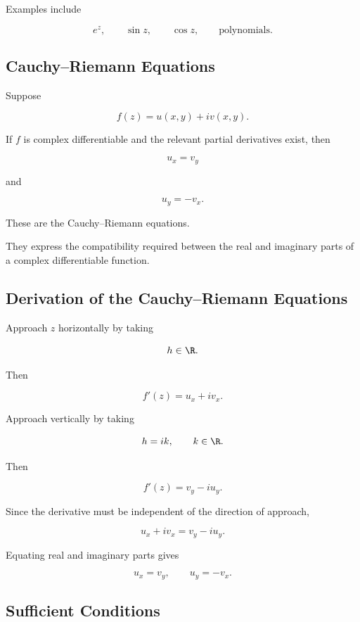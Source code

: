 Examples include

\[
\boxed{
e^z,
\qquad
\sin z,
\qquad
\cos z,
\qquad
\text{polynomials}.
}
\]

\subsection{Cauchy--Riemann Equations}
\label{subsec:cauchy-riemann}

Suppose

\[
f(z)=u(x,y)+iv(x,y).
\]

If \(f\) is complex differentiable and the relevant partial derivatives
exist, then

\[
\boxed{
u_x=v_y
}
\]

and

\[
\boxed{
u_y=-v_x.
}
\]

These are the Cauchy--Riemann equations.

They express the compatibility required between the real and imaginary
parts of a complex differentiable function.

\subsection{Derivation of the Cauchy--Riemann Equations}
\label{subsec:derivation-cauchy-riemann}

Approach \(z\) horizontally by taking

\[
h\in\R.
\]

Then

\[
f'(z)
=
u_x+iv_x.
\]

Approach vertically by taking

\[
h=ik,
\qquad
k\in\R.
\]

Then

\[
f'(z)
=
v_y-iu_y.
\]

Since the derivative must be independent of the direction of approach,

\[
u_x+iv_x
=
v_y-iu_y.
\]

Equating real and imaginary parts gives

\[
\boxed{
u_x=v_y,
\qquad
u_y=-v_x.
}
\]

\subsection{Sufficient Conditions}
\label{subsec:cauchy-riemann-sufficient}

